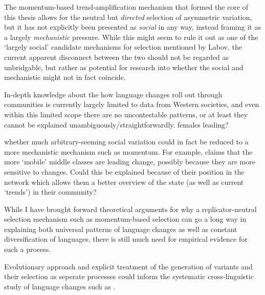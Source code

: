 The momentum-based trend-amplification mechanism that formed the core of this thesis allows for the neutral but \emph{directed} selection of asymmetric variation, but it has not explicitly been presented as \emph{social} in any way, instead framing it as a largely \emph{mechanistic} pressure.
While this might seem to rule it out as one of the `largely social' candidate mechanisms for selection mentioned by Labov, the current apparent disconnect between the two should not be regarded as unbridgable, but rather as potential for research into whether the social and mechanistic might not in fact coincide.

In-depth knowledge about the how language changes roll out through communities is currently largely limited to data from Western societies, and even within this limited scope there are no uncontestable patterns, or at least they cannot be explained unambiguously/straightforwardly. females leading?


 whether much arbitrary-seeming social variation could in fact be reduced to a more mechanistic mechanism such as momentum. For example, claims that the more `mobile' middle classes are leading change, possibly because they are more sensitive to changes. Could this be explained because of their position in the network which allows them a better overview of the state (as well as current `trends') in their community?

While I have brought forward theoretical arguments for why a replicator-neutral selection mechanism such as momentum-based selection can go a long way in explaining both universal patterns of language changes as well as constant diversification of languages, there is still much need for empirical evidence for such a process.

Evolutionary approach and explicit treatment of the generation of variants and their selection as seperate processes could inform the systematic cross-linguistic study of language changes such as \citet{Bickel2015}.%
